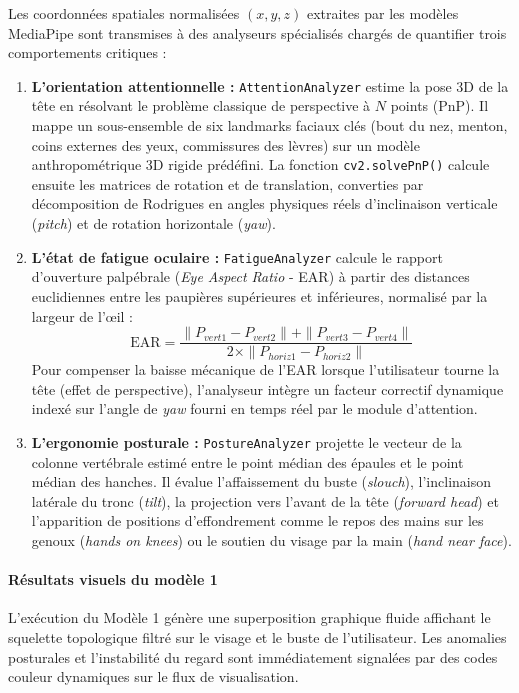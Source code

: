 Les coordonnées spatiales normalisées $(x, y, z)$ extraites par les modèles MediaPipe sont transmises à des analyseurs spécialisés chargés de quantifier trois comportements critiques :
\begin{enumerate}
    \item \textbf{L'orientation attentionnelle :} \texttt{AttentionAnalyzer} estime la pose 3D de la tête en résolvant le problème classique de perspective à $N$ points (PnP). Il mappe un sous-ensemble de six landmarks faciaux clés (bout du nez, menton, coins externes des yeux, commissures des lèvres) sur un modèle anthropométrique 3D rigide prédéfini. La fonction \texttt{cv2.solvePnP()} calcule ensuite les matrices de rotation et de translation, converties par décomposition de Rodrigues en angles physiques réels d'inclinaison verticale (\textit{pitch}) et de rotation horizontale (\textit{yaw}).
    \item \textbf{L'état de fatigue oculaire :} \texttt{FatigueAnalyzer} calcule le rapport d'ouverture palpébrale (\textit{Eye Aspect Ratio} - EAR) à partir des distances euclidiennes entre les paupières supérieures et inférieures, normalisé par la largeur de l'œil :
    \begin{equation}
        \text{EAR} = \frac{\|P_{vert1} - P_{vert2}\| + \|P_{vert3} - P_{vert4}\|}{2 \times \|P_{horiz1} - P_{horiz2}\|}
    \end{equation}
    Pour compenser la baisse mécanique de l'EAR lorsque l'utilisateur tourne la tête (effet de perspective), l'analyseur intègre un facteur correctif dynamique indexé sur l'angle de \textit{yaw} fourni en temps réel par le module d'attention.
    \item \textbf{L'ergonomie posturale :} \texttt{PostureAnalyzer} projette le vecteur de la colonne vertébrale estimé entre le point médian des épaules et le point médian des hanches. Il évalue l'affaissement du buste (\textit{slouch}), l'inclinaison latérale du tronc (\textit{tilt}), la projection vers l'avant de la tête (\textit{forward head}) et l'apparition de positions d'effondrement comme le repos des mains sur les genoux (\textit{hands on knees}) ou le soutien du visage par la main (\textit{hand near face}).
\end{enumerate}

\paragraph{Résultats visuels du modèle 1}

L'exécution du Modèle 1 génère une superposition graphique fluide affichant le squelette topologique filtré sur le visage et le buste de l'utilisateur. Les anomalies posturales et l'instabilité du regard sont immédiatement signalées par des codes couleur dynamiques sur le flux de visualisation.

